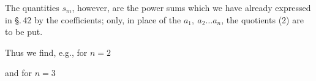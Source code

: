 The quantities $s_m$, however, are the power sums which we have already
expressed in \S.\,42 by the coefficients; only, in place
of the $a_1,\ a_2 \ldots a_n$, the quotients (2) are to be put.

Thus we find, e.g., for $n = 2$


and for $n = 3$

